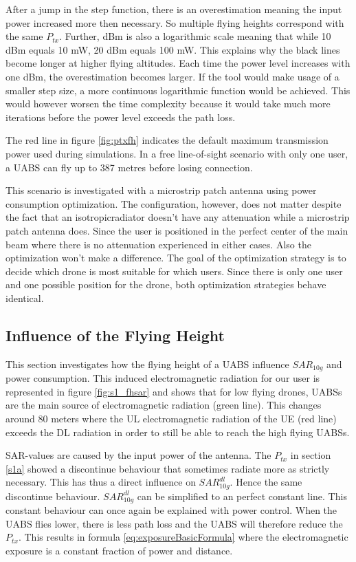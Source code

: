 After a jump in the step function, there is an overestimation meaning the input power increased more then necessary. So multiple flying heights correspond with the same $P_{tx}$.
Further, dBm is also a logarithmic scale meaning that while 10 dBm equals 10 mW, 20 dBm equals 100 mW. This explains why the black lines become longer at higher flying altitudes.
Each time the power level increases with one dBm, the overestimation becomes larger. If the tool would make usage of a smaller step size, a more continuous 
logarithmic function would be achieved. This would however worsen the time complexity because it would take much more iterations before 
the power level exceeds the path loss. 

The red line in figure \ref{fig:ptxfh} indicates the default maximum transmission power used during simulations. 
In a free line-of-sight scenario with only one user, a \gls{UABS} can fly up to 387 metres before losing connection.

This scenario is investigated with a microstrip patch antenna using power consumption optimization. The configuration, however, does not matter
despite the fact that an \gls{isotropicradiator} doesn't have any attenuation while a microstrip patch antenna does.
Since the user is positioned in the perfect center of the main beam where there is 
no attenuation experienced in either cases. Also the optimization won't make a difference. The goal of the optimization strategy is to decide which 
drone is most suitable for which users. Since there is only one user and one possible position for the drone, both optimization strategies behave identical.

\FloatBarrier
\subsection{Influence of the Flying Height}
\label{sub:senario1_influenceOfFlyHeight}

This section investigates how the flying height of a \gls{UABS} influence $SAR_{10g}$ and power consumption.
This induced electromagnetic radiation for our user is represented in figure \ref{fig:s1_fhsar}
and shows that for low flying drones, \gls{UABS}s are the main source of electromagnetic radiation (green line).
This changes around 80 meters where the \gls{UL} electromagnetic radiation of the \gls{UE} (red line)
exceeds the \gls{DL} radiation in order to still be able to reach the high flying \gls{UABS}s.

\gls{SAR}-values are caused by the input power of the antenna. The $P_{tx}$ in section \ref{s1a}
showed a discontinue behaviour that sometimes radiate more as strictly necessary. This has thus a direct influence
on  $SAR^{dl}_{10g}$. Hence the same discontinue behaviour. $SAR^{dl}_{10g}$ can be simplified to an perfect constant line.
This constant behaviour can once again be explained with power control. When the \gls{UABS} flies lower, there is  less path loss and the \gls{UABS} 
will therefore reduce the $P_{tx}$. This results in formula \ref{eq:exposureBasicFormula} where the electromagnetic exposure is a constant fraction of power and distance.


